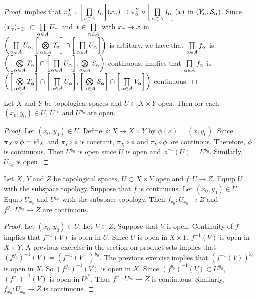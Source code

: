 \documentclass{book}
\begin{document}
\begin{proof}
		 implies that $\pi^Y_{\alpha} \circ \bigg[ \prod\limits_{\alpha \in A}f_{\alpha} \bigg] (x_{\gamma}) \rightarrow \pi^Y_{\alpha} \circ \bigg[ \prod\limits_{\alpha \in A}f_{\alpha} \bigg] (x) $ in $(Y_{\alpha}, \mathcal{S}_{\alpha})$. Since $(x_{\gamma})_{\gamma \in \Gamma} \subset \prod\limits_{\alpha \in A} U_{\alpha}$ and $x \in \prod\limits_{\alpha \in A}$ with $x_{\gamma} \rightarrow x$ in $\bigg( \prod\limits_{\alpha \in A} U_{\alpha} , \bigg[ \bigotimes\limits_{\alpha \in A} \mathcal{T}_{\alpha} \bigg] \cap \bigg[ \prod\limits_{\alpha \in A} U_{\alpha} \bigg] \bigg)$ is arbitary, we have that $\prod\limits_{\alpha \in A}f_{\alpha}$ is $\bigg( \bigg[ \bigotimes\limits_{\alpha \in A} T_{\alpha} \bigg]  \cap \bigg[ \prod\limits_{\alpha \in A} U_{\alpha} \bigg], \bigotimes\limits_{\alpha \in A} S_{\alpha} \bigg)$-continuous.  implies that $\prod\limits_{\alpha \in A}f_{\alpha}$ is $\bigg( \bigg[ \bigotimes\limits_{\alpha \in A} T_{\alpha} \bigg]  \cap \bigg[ \prod\limits_{\alpha \in A} U_{\alpha} \bigg], \bigg[ \bigotimes\limits_{\alpha \in A} S_{\alpha} \bigg] \cap \bigg[ \prod\limits_{\alpha \in A} V_{\alpha} \bigg] \bigg)$-continuous.
	\end{proof}
	
	\begin{ex}
		Let $X$ and $Y$ be topological spaces and $U \subset X \times Y$ open. Then for each $(x_0,  y_0) \in U$, $U^{x_0}$ and $U^{y_0}$ are open.
	\end{ex}
	
	\begin{proof}
		Let $(x_0, y_0) \in U$. Define $\phi: X \rightarrow X \times Y$ by $\phi(x) = (x, y_0)$. Since $\pi_X \circ \phi = \operatorname{id}_X$ and $\pi_Y \circ \phi$ is constant, $\pi_X \circ \phi$ and $\pi_Y \circ \phi$ are continous. Therefore, $\phi$ is continuous. Then $U^{y_0}$ is open since $U$ is open and $\phi^{-1}(U) = U^{y_0}$. Similarly, $U_{x_0}$ is open.
	\end{proof}

	\begin{ex}
		Let $X$, $Y$ and $Z$ be topological spaces, $U \subset X \times Y$ open and $f: U \rightarrow Z$. Equip $U$ with the subspace topology. Suppose that $f$ is continuous. Let $(x_0, y_0) \in U$. Equip $U_{x_0}$ and $U^{y_0}$ with the subspace topology. Then $f_{x_0}:U_{x_0} \rightarrow Z$ and $f^{y_0}: U^{y_0} \rightarrow Z$ are continuous.
	\end{ex}

	\begin{proof}
		Let $(x_0, y_0) \in U$. Let $V \subset Z$. Suppose that $V$ is open. Continuity of $f$ implies that $f^{-1}(V)$ is open in $U$. Since $U$ is open in $X \times Y$, $f^{-1}(V)$ is open in $X \times Y$. A previous exercise in the section on product sets implies that $(f^{y_0})^{-1}(V) = (f^{-1}(V))^{y_0}$. The previous exercise implies that $(f^{-1}(V))^{y_0}$ is open in $X$. So $(f^{y_0})^{-1}(V)$ is open in $X$. Since $(f^{y_0})^{-1}(V) \subset U^{y_0}$, $(f^{y_0})^{-1}(V)$ is open in $U^{y^0}$. Thus $f^{y_0}: U^{y_0} \rightarrow Z$ is continuous. Similarly, $f_{x_0}: U_{x_0} \rightarrow Z$ is continuous.
	\end{proof}
	
\end{document}
